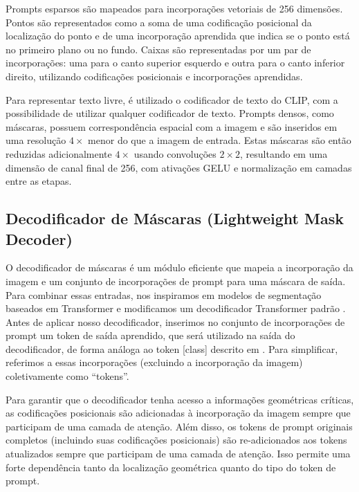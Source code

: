 Prompts esparsos são mapeados para incorporações vetoriais de 256 dimensões. Pontos são representados como a soma de uma codificação posicional da localização do ponto e de uma incorporação aprendida que indica se o ponto está no primeiro plano ou no fundo. Caixas são representadas por um par de incorporações: uma para o canto superior esquerdo e outra para o canto inferior direito, utilizando codificações posicionais e incorporações aprendidas.

Para representar texto livre, é utilizado o codificador de texto do CLIP, com a possibilidade de utilizar qualquer codificador de texto. Prompts densos, como máscaras, possuem correspondência espacial com a imagem e são inseridos em uma resolução \(4\times\) menor do que a imagem de entrada. Estas máscaras são então reduzidas adicionalmente \(4\times\) usando convoluções \(2 \times 2\), resultando em uma dimensão de canal final de 256, com ativações GELU e normalização em camadas entre as etapas.

\subsection{Decodificador de Máscaras (Lightweight Mask Decoder)}

O decodificador de máscaras é um módulo eficiente que mapeia a incorporação da imagem e um conjunto de incorporações de prompt para uma máscara de saída. Para combinar essas entradas, nos inspiramos em modelos de segmentação baseados em Transformer \cite{DBLP:journals/corr/abs-2005-12872}\cite{NEURIPS2021_950a4152} e modificamos um decodificador Transformer padrão \cite{DBLP:journals/corr/VaswaniSPUJGKP17}. Antes de aplicar nosso decodificador, inserimos no conjunto de incorporações de prompt um token de saída aprendido, que será utilizado na saída do decodificador, de forma análoga ao token [class] descrito em \cite{DBLP:journals/corr/VaswaniSPUJGKP17}. Para simplificar, referimos a essas incorporações (excluindo a incorporação da imagem) coletivamente como “tokens”.

Para garantir que o decodificador tenha acesso a informações geométricas críticas, as codificações posicionais são adicionadas à incorporação da imagem sempre que participam de uma camada de atenção. Além disso, os tokens de prompt originais completos (incluindo suas codificações posicionais) são re-adicionados aos tokens atualizados sempre que participam de uma camada de atenção. Isso permite uma forte dependência tanto da localização geométrica quanto do tipo do token de prompt.

